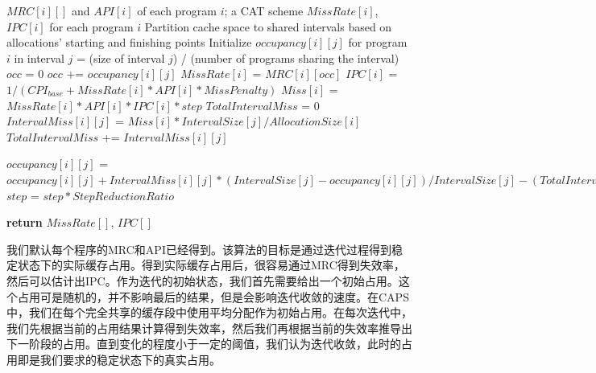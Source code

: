\begin{algorithm}
\caption{Prediction Algorithm}
\label{alg:pred}
\begin{algorithmic}[1]
\renewcommand{\algorithmicforall}{\textbf{foreach}}
\renewcommand{\algorithmicrequire}{\textbf{Input:}}
\renewcommand{\algorithmicensure}{\textbf{Output:}}
\REQUIRE $MRC[i][]$ and $API[i]$ of each program $i$; a CAT scheme
\ENSURE $MissRate[i]$, $IPC[i]$ for each program $i$
\STATE Partition cache space to shared intervals based on allocations' starting and finishing points
\STATE Initialize $occupancy[i][j]$ for program $i$ in interval $j$ = (size of interval $j$) / (number of programs sharing the interval)
    	\STATE $occ$ = $0$
			\STATE $occ$ += $occupancy[i][j]$
        \ENDFOR
        \STATE $MissRate[i]$ = $MRC[i][occ]$
        \STATE $IPC[i]$ = $1 / (CPI_{base} + MissRate[i] * API[i] * MissPenalty)$
        \STATE $Miss[i]$ = $MissRate[i] * API[i] * IPC[i] * step$
    \ENDFOR
    	\STATE $TotalIntervalMiss$ = $0$
        	\STATE $IntervalMiss[i][j]$ = $Miss[i] * IntervalSize[j] / AllocationSize[i]$
            \STATE $TotalIntervalMiss$ += $IntervalMiss[i][j]$ 
		\ENDFOR
        
        	\STATE $occupancy[i][j]$ =  $occupancy[i][j] + IntervalMiss[i][j] * (IntervalSize[j] - occupancy[i][j]) / IntervalSize[j] - (TotalIntervalMiss - IntervalMiss[i][j]) * occupancy[i][j] / IntervalSize[j]$
		\ENDFOR
    \ENDFOR
    	\STATE $step$ = $step * StepReductionRatio$
    \ENDIF
\ENDWHILE

\STATE \textbf{return} $MissRate[]$, $IPC[]$

\end{algorithmic}
\end{algorithm}

我们默认每个程序的MRC和API已经得到。该算法的目标是通过迭代过程得到稳定状态下的实际缓存占用。得到实际缓存占用后，很容易通过MRC得到失效率，然后可以估计出IPC。作为迭代的初始状态，我们首先需要给出一个初始占用。这个占用可是随机的，并不影响最后的结果，但是会影响迭代收敛的速度。在CAPS中，我们在每个完全共享的缓存段中使用平均分配作为初始占用。在每次迭代中，我们先根据当前的占用结果计算得到失效率，然后我们再根据当前的失效率推导出下一阶段的占用。直到变化的程度小于一定的阈值，我们认为迭代收敛，此时的占用即是我们要求的稳定状态下的真实占用。

